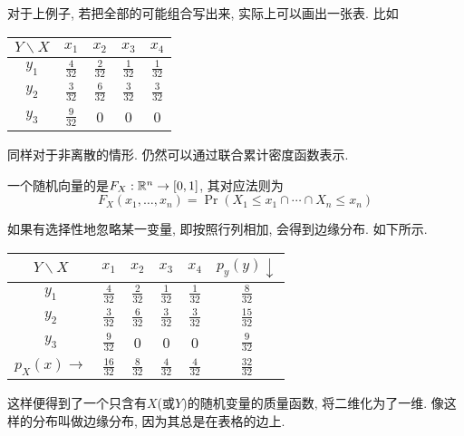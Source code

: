 \documentclass{ctexart}
\begin{document}
\begin{example}
    对于上例子, 若把全部的可能组合写出来, 实际上可以画出一张表. 比如
    \begin{center}
        \begin{tabular}{|c|c|c|c|c|}
\hline $Y \backslash X$ & ${x}_1$ & ${x}_2$ & ${x}_3$ & ${x}_4$ \\
\hline$y_1$ & $\frac{4}{32}$ & $\frac{2}{32}$ & $\frac{1}{32}$ & $\frac{1}{32}$ \\
\hline$y_2$ & $\frac{3}{32}$ & $\frac{6}{32}$ & $\frac{3}{32}$ & $\frac{3}{32}$ \\
\hline$y_3$ & $\frac{9}{32}$ & 0 & 0 & 0 \\
\hline
\end{tabular}
    \end{center}
\end{example}

同样对于非离散的情形. 仍然可以通过联合累计密度函数表示. 

\begin{definition}[联合累积密度函数]
    一个随机向量的是$F_X:\mathbb R^n \to [0,1]$, 其对应法则为
    $$
F_X\left(x_1, \ldots, x_n\right)=\operatorname{Pr}\left(X_1 \leq x_1 \cap \cdots \cap X_n \leq x_n\right)
$$

\end{definition}

如果有选择性地忽略某一变量, 即按照行列相加, 会得到边缘分布. 如下所示. 
\begin{center}
\begin{tabular}{|c|c|c|c|c|c|}
\hline ${Y}\backslash {X}$ & ${x}_1$ & $x_2$ & $x_3$ & $x_4$ & $p_y(y) \downarrow$ \\
\hline$y_1$ & $\frac{4}{32}$ & $\frac{2}{32}$ & $\frac{1}{32}$ & $\frac{1}{32}$ & $\frac{8}{32}$ \\
\hline$y_2$ & $\frac{3}{32}$ & $\frac{6}{32}$ & $\frac{3}{32}$ & $\frac{3}{32}$ & $\frac{15}{32}$ \\
\hline$y_3$ & $\frac{9}{32}$ & 0 & 0 & 0 & $\frac{9}{32}$ \\
\hline$p_X(x) \rightarrow$ & $\frac{16}{32}$ & $\frac{8}{32}$ & $\frac{4}{32}$ & $\frac{4}{32}$ & $\frac{32}{32}$ \\
\hline
\end{tabular}
\end{center}

这样便得到了一个只含有$X$(或$Y$)的随机变量的质量函数, 将二维化为了一维. 像这样的分布叫做边缘分布, 因为其总是在表格的边上. 
\end{document}
